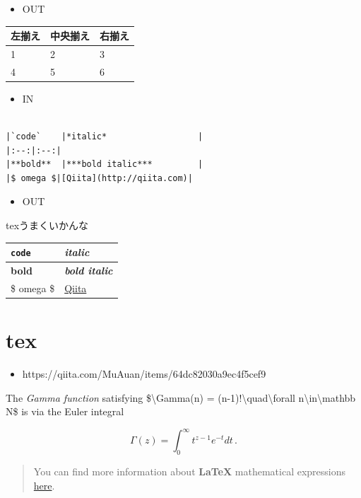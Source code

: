 \documentclass[]{article}
\begin{document}
\begin{itemize}
\item
  OUT
\end{itemize}

\begin{longtable}[]{@{}lll@{}}
\toprule
左揃え & 中央揃え & 右揃え\tabularnewline
\midrule
\endhead
1 & 2 & 3\tabularnewline
4 & 5 & 6\tabularnewline
\bottomrule
\end{longtable}

\begin{itemize}
\item
  IN
\end{itemize}

\begin{verbatim}

|`code`    |*italic*                  |
|:--:|:--:|
|**bold**  |***bold italic***         |
|$ omega $|[Qiita](http://qiita.com)|
\end{verbatim}

\begin{itemize}
\item
  OUT
\end{itemize}

texうまくいかんな

\begin{longtable}[]{@{}ll@{}}
\toprule
\texttt{code} & \emph{italic}\tabularnewline
\midrule
\endhead
\textbf{bold} & \textbf{\emph{bold italic}}\tabularnewline
\$ omega \$ & \href{http://qiita.com}{Qiita}\tabularnewline
\bottomrule
\end{longtable}

\section{tex}\label{header-n423}

\begin{itemize}
\item
  https://qiita.com/MuAuan/items/64dc82030a9ec4f5cef9
\end{itemize}

The \emph{Gamma function} satisfying \$\textbackslash{}Gamma(n) =
(n-1)!\textbackslash{}quad\textbackslash{}forall
n\textbackslash{}in\textbackslash{}mathbb N\$ is via the Euler integral

\[\Gamma(z) = \int_0^\infty t^{z-1}e^{-t}dt\,.\]

\begin{quote}
You can find more information about \textbf{LaTeX} mathematical
expressions
\href{http://meta.math.stackexchange.com/questions/5020/mathjax-basic-tutorial-and-quick-reference}{here}.
\end{quote}
\end{document}
